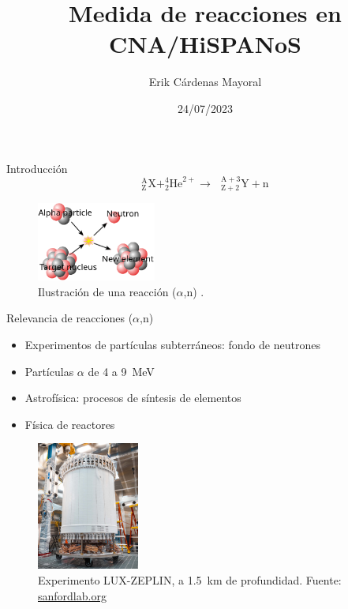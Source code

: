 \documentclass[11pt]{beamer}
\author{Erik Cárdenas Mayoral}
\title{Medida de reacciones \an en CNA/HiSPANoS}
\institute{Máster Inter-Universitario de Física Nuclear}
\date{24/07/2023}
\newcommand{\an}{($\alpha$,n) }
\begin{document}
\begin{frame}
\titlepage
\end{frame}


\begin{frame}{Introducción}
	\[ ^\text{A}_\text{Z}\text{X} + ^4_2\text{He}^{2+} \longrightarrow \text{ } ^{\text{A}+3}_{\text{Z}+2}\text{Y} + \text{n}     \]
	\begin{figure}[H]
		\centering
		\includegraphics[width=0.35\textwidth]{anreaction.png}
		\caption{Ilustración de una reacción \an.}
		\label{anreaction}
	\end{figure}
\end{frame}

\begin{frame}{Relevancia de reacciones \an}
	\begin{itemize}
		\item Experimentos de partículas subterráneos: fondo de neutrones
		\item Partículas $\alpha$ de 4 a \qty{9}{\MeV}
		\item Astrofísica: procesos de síntesis de elementos
		\item Física de reactores
	\end{itemize}
	\begin{figure}[H]
		\centering
		\includegraphics[width=0.3\textwidth]{sanford.jpg}
		\caption{Experimento LUX-ZEPLIN, a \qty{1.5}{\kilo\meter} de profundidad. Fuente: \href{https://sanfordlab.org/experiment/lux-zeplin}{sanfordlab.org}}
		\label{}
	\end{figure}
\end{frame}
\end{document}
